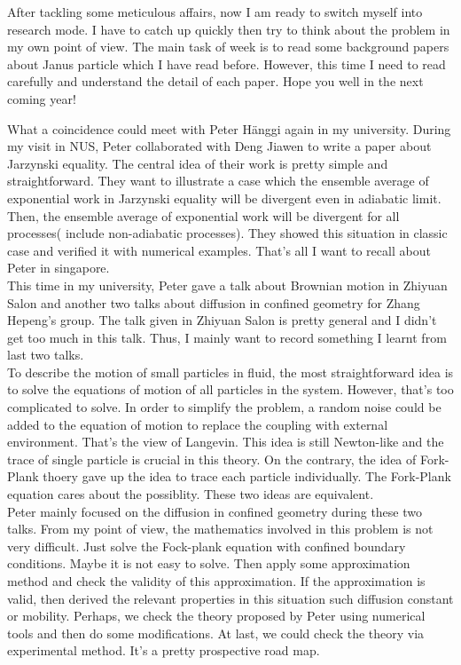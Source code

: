 \documentclass[fontsize=11pt, %
                             paper=a4, %
                             twoside, %
                             captions=tableheading,
                             index=totoc,
                             hyperref]{labbook}
\begin{document}
\begin{addmargin}[4cm]{0cm}
After tackling some meticulous affairs, now I am ready to switch myself into research mode. I have to catch up quickly then try to think about the problem in my own point of view. The main task of week is to read some background papers\cite{ChiangVelegol2014,Fixman1980,Kline2006,OBrienWhite1978,RobertJ.HunterRowell1981,Teubner1982} about Janus particle which I have read before. However, this time I need to read carefully and understand the detail of each paper. Hope you well in the next coming year!

What a coincidence could meet with Peter H{\"a}nggi again in my university. During my visit in NUS, Peter collaborated with Deng Jiawen to write a paper about Jarzynski equality\cite{Jarzynski1997}. The central idea of their work is pretty simple and straightforward. They want to illustrate a case which the ensemble average of exponential work in Jarzynski equality will be divergent even in adiabatic limit. Then, the ensemble average of exponential work will be divergent for all processes( include non-adiabatic processes). They showed this situation in classic case and verified it with numerical examples. That's all I want to recall about Peter in singapore. \\
This time in my university, Peter gave a talk about Brownian motion in Zhiyuan Salon and another two talks about diffusion in confined geometry \cite{burada2009diffusion} for Zhang Hepeng's group. The talk given in Zhiyuan Salon is pretty general and I didn't get too much in this talk. Thus, I mainly want to record something I learnt from last two talks.\\
To describe the motion of small particles in fluid, the most straightforward idea is to solve the equations of motion of all particles in the system. However, that's too complicated to solve. In order to simplify the problem, a random noise could be added to the equation of motion to replace the coupling with external environment. That's the view of Langevin. This idea is still Newton-like and the trace of single particle is crucial in this theory. On the contrary, the idea of Fork-Plank thoery gave up the idea to trace each particle individually. The Fork-Plank equation cares about the possiblity. These two ideas are equivalent.\\
Peter mainly focused on the diffusion in confined geometry during these two talks. From my point of view, the mathematics involved in this problem is not very difficult. Just solve the Fock-plank equation with confined boundary conditions. Maybe it is not easy to solve. Then apply some approximation method and check the validity of this approximation. If the approximation is valid, then derived the relevant properties in this situation such diffusion constant or mobility. Perhaps, we check the theory proposed by Peter using numerical tools and then do some modifications. At last, we could check the theory via experimental method. It's a pretty prospective road map. \\

\end{addmargin}
\end{document}
